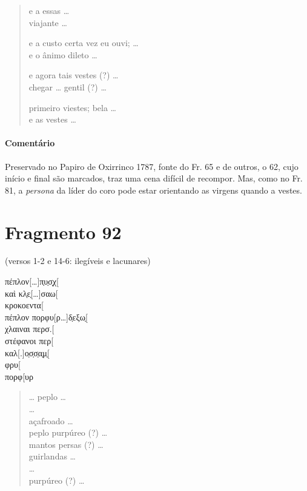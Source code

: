 {\begin{verse}
e a essas \ldots{}\\
viajante \ldots{}

e a custo certa vez eu ouvi; \ldots{}\\
e o ânimo dileto \ldots{}

e agora tais vestes (?) \ldots{}\\
chegar \ldots{} gentil (?) \ldots{}

primeiro viestes; bela \ldots{}\\
e as vestes \ldots{}
\end{verse}

{\paragraph{Comentário} Preservado no Papiro de Oxirrinco 1787, fonte do Fr. 65 e de outros, o 62, cujo início e final são marcados, traz uma cena difícil de recompor. Mas, como no Fr. 81, a \textit{persona} da líder do coro pode estar orientando as virgens quando a vestes.}


\section{Fragmento 92} 

\begin{gkverse}
\textnormal{(versos 1-2 e 14-6: ilegíveis e lacunares) }

πέπλον[\ldots{}]π̣υ̣σ̣χ[\\
καὶ κλ̣ε̣[\ldots{}]σαω[\\
κροκοεντα[\\
πέπλον πορφυ[ρ\ldots{}]δ̣εξω̣[\\
χλαιναι περσ.[\\
στέφανοι περ[\\
καλ[.]ο̣σ̣σ̣α̣μ̣[\\
φρυ[\\
πορφ[υρ
\end{gkverse}

\begin{verse}
\ldots{} peplo \ldots{}\\ 
\ldots{}\\
açafroado \ldots{}\\
peplo purpúreo (?) \ldots{}\\
mantos persas (?) \ldots{}\\
guirlandas \ldots{}\\
\ldots{}\\
purpúreo (?) \ldots{}
\end{verse}

}
